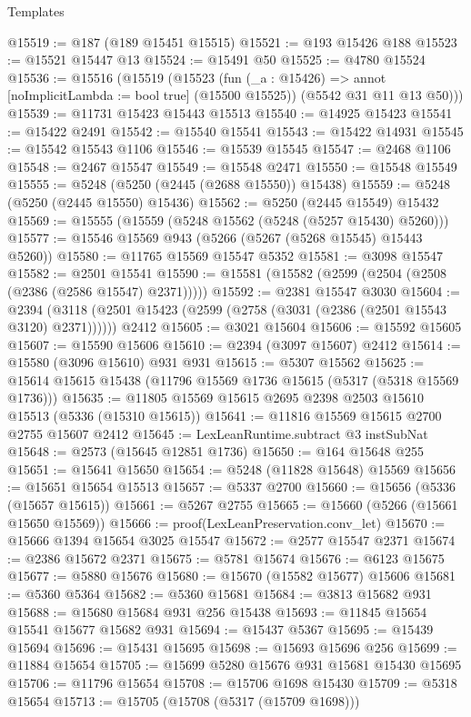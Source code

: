 \begin{lexlean}{Templates}
\begin{coremodule}
@15519 := @187 (@189 @15451 @15515)
@15521 := @193 @15426 @188
@15523 := @15521 @15447 @13
@15524 := @15491 @50
@15525 := @4780 @15524
@15536 := @15516
    (@15519
      (@15523
        (fun (_a : @15426) => annot [noImplicitLambda := bool true] (@15500 @15525))
        (@5542 @31 @11 @13 @50)))
@15539 := @11731 @15423 @15443 @15513
@15540 := @14925 @15423
@15541 := @15422 @2491
@15542 := @15540 @15541
@15543 := @15422 @14931
@15545 := @15542 @15543 @1106
@15546 := @15539 @15545
@15547 := @2468 @1106
@15548 := @2467 @15547
@15549 := @15548 @2471
@15550 := @15548 @15549
@15555 := @5248 (@5250 (@2445 (@2688 @15550)) @15438)
@15559 := @5248 (@5250 (@2445 @15550) @15436)
@15562 := @5250 (@2445 @15549) @15432
@15569 := @15555 (@15559 (@5248 @15562 (@5248 (@5257 @15430) @5260)))
@15577 := @15546 @15569 @943 (@5266 (@5267 (@5268 @15545) @15443 @5260))
@15580 := @11765 @15569 @15547 @5352
@15581 := @3098 @15547
@15582 := @2501 @15541
@15590 := @15581 (@15582 (@2599 (@2504 (@2508 (@2386 (@2586 @15547) @2371)))))
@15592 := @2381 @15547 @3030
@15604 := @2394
    (@3118 (@2501 @15423 (@2599 (@2758 (@3031 (@2386 (@2501 @15543 @3120) @2371))))))
    @2412
@15605 := @3021 @15604
@15606 := @15592 @15605
@15607 := @15590 @15606
@15610 := @2394 (@3097 @15607) @2412
@15614 := @15580 (@3096 @15610) @931 @931
@15615 := @5307 @15562
@15625 := @15614 @15615 @15438 (@11796 @15569 @1736 @15615 (@5317 (@5318 @15569 @1736)))
@15635 := @11805 @15569 @15615 @2695 @2398 @2503 @15610 @15513 (@5336 (@15310 @15615))
@15641 := @11816 @15569 @15615 @2700 @2755 @15607 @2412
@15645 := LexLeanRuntime.subtract @3 instSubNat
@15648 := @2573 (@15645 @12851 @1736)
@15650 := @164 @15648 @255
@15651 := @15641 @15650
@15654 := @5248 (@11828 @15648) @15569
@15656 := @15651 @15654 @15513
@15657 := @5337 @2700
@15660 := @15656 (@5336 (@15657 @15615))
@15661 := @5267 @2755
@15665 := @15660 (@5266 (@15661 @15650 @15569))
@15666 := proof(LexLeanPreservation.conv_let)
@15670 := @15666 @1394 @15654 @3025 @15547
@15672 := @2577 @15547 @2371
@15674 := @2386 @15672 @2371
@15675 := @5781 @15674
@15676 := @6123 @15675
@15677 := @5880 @15676
@15680 := @15670 (@15582 @15677) @15606
@15681 := @5360 @5364
@15682 := @5360 @15681
@15684 := @3813 @15682 @931
@15688 := @15680 @15684 @931 @256 @15438
@15693 := @11845 @15654 @15541 @15677 @15682 @931
@15694 := @15437 @5367
@15695 := @15439 @15694
@15696 := @15431 @15695
@15698 := @15693 @15696 @256
@15699 := @11884 @15654
@15705 := @15699 @5280 @15676 @931 @15681 @15430 @15695
@15706 := @11796 @15654
@15708 := @15706 @1698 @15430
@15709 := @5318 @15654
@15713 := @15705 (@15708 (@5317 (@15709 @1698)))

\end{coremodule}
\end{lexlean}
